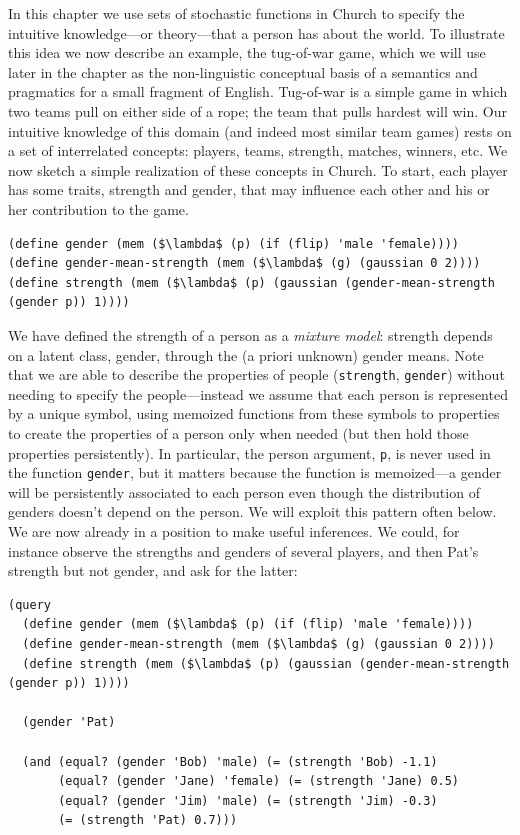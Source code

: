 \documentclass[pdfextras]{handbook}
\begin{document}
In this chapter we use sets of stochastic functions in Church to specify the intuitive knowledge---or theory---that a person has about the world. 
To illustrate this idea we now describe an example, the tug-of-war game, which we will use later in the chapter as the non-linguistic conceptual basis of a semantics and pragmatics for a small fragment of English. 
Tug-of-war is a simple game in which two teams pull on either side of a rope; the team that pulls hardest will win. 
Our intuitive knowledge of this domain (and indeed most similar team games) rests on a set of interrelated concepts: players, teams, strength, matches, winners, etc. 
We now sketch a simple realization of these concepts in Church. 
To start, each player has some traits, strength and gender, that may influence each other and his or her contribution to the game.
\begin{lstlisting}[mathescape]
(define gender (mem ($\lambda$ (p) (if (flip) 'male 'female))))
(define gender-mean-strength (mem ($\lambda$ (g) (gaussian 0 2))))
(define strength (mem ($\lambda$ (p) (gaussian (gender-mean-strength (gender p)) 1))))
\end{lstlisting}
We have defined the strength of a person as a \emph{mixture model}: strength depends on a latent class, gender, through the (a priori unknown) gender means. 
Note that we are able to describe the properties of people (\lstinline{strength}, \lstinline{gender}) without needing to specify the people---instead we assume that each person is represented by a unique symbol, using memoized functions from these symbols to properties to create the properties of a person only when needed (but then hold those properties persistently). 
In particular, the person argument, \lstinline{p}, is never used in the function \lstinline{gender}, but it matters because the function is memoized---a gender will be persistently associated to each person even though the distribution of genders doesn't depend on the person. 
We will exploit this pattern often below.
We are now already in a position to make useful inferences. 
We could, for instance observe the strengths and genders of several players, and then Pat's strength but not gender, and ask for the latter:
\begin{lstlisting}[mathescape]
(query
  (define gender (mem ($\lambda$ (p) (if (flip) 'male 'female))))
  (define gender-mean-strength (mem ($\lambda$ (g) (gaussian 0 2))))
  (define strength (mem ($\lambda$ (p) (gaussian (gender-mean-strength (gender p)) 1))))
  
  (gender 'Pat)
  
  (and (equal? (gender 'Bob) 'male) (= (strength 'Bob) -1.1)
       (equal? (gender 'Jane) 'female) (= (strength 'Jane) 0.5)
       (equal? (gender 'Jim) 'male) (= (strength 'Jim) -0.3)
       (= (strength 'Pat) 0.7)))
\end{lstlisting}
\end{document}

